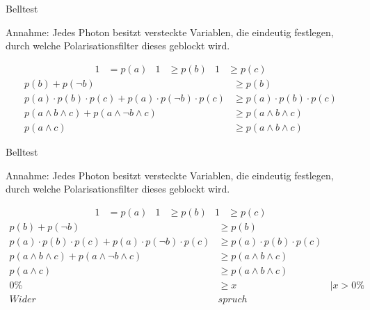 \documentclass[]{beamer}
\begin{document}

\begin{frame}{Belltest}
\begin{center}
Annahme: Jedes Photon besitzt versteckte Variablen, die eindeutig festlegen, durch welche Polarisationsfilter dieses geblockt wird.
\end{center}
\vspace{-0.5cm}
\begin{align*}
 	1 &= p(a)&
 	1&\geqslant p(b)&
 	1&\geqslant p(c)
\end{align*}
\vspace{-1cm}
\begin{align*}
 	p(b)+p(\neg b) &\geqslant p(b)\\
 	p(a)\cdot p(b) \cdot p(c) + p(a)\cdot p(\neg b) \cdot p(c) &\geqslant p(a)\cdot p(b) \cdot p(c)\\
 	p(a \wedge b \wedge c)+p(a \wedge \neg b \wedge c) &\geqslant p(a \wedge b \wedge c)\\
 	p(a \wedge c) &\geqslant p(a \wedge b \wedge c)
\end{align*}
\end{frame}

\begin{frame}{Belltest}
\begin{center}
 Annahme: Jedes Photon besitzt versteckte Variablen, die eindeutig festlegen, durch welche Polarisationsfilter dieses geblockt wird.
\end{center}
\vspace{-0.5cm}
\begin{align*}
 	1 &= p(a)&
 	1&\geqslant p(b)&
 	1&\geqslant p(c)
\end{align*}
\vspace{-1cm}
\begin{align*}
 	p(b)+p(\neg b) &\geqslant p(b)\\
 	p(a)\cdot p(b) \cdot p(c) + p(a)\cdot p(\neg b) \cdot p(c) &\geqslant p(a)\cdot p(b) \cdot p(c)\\
 	p(a \wedge b \wedge c)+p(a \wedge \neg b \wedge c) &\geqslant p(a \wedge b \wedge c)\\
 	p(a \wedge c) &\geqslant p(a \wedge b \wedge c)\\
 	0\% &\geqslant x &| x>0\%\\
 	Wider&spruch
\end{align*}
\end{frame}
\end{document}
